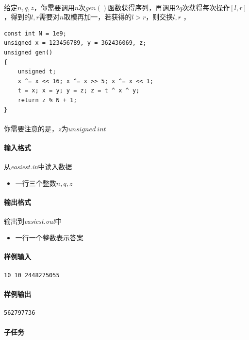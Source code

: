 \documentclass[UTF8]{ctexart}
\begin{document}
\paragraph{}给定$n,q,z$，你需要调用$n$次$gen()$函数获得序列，再调用$2q$次获得每次操作$[l,r]$，得到的$l,r$需要对$n$取模再加一，若获得的$l>r$，则交换$l,r$
\lstset{language=C++}，
\begin{lstlisting}
const int N = 1e9;
unsigned x = 123456789, y = 362436069, z;
unsigned gen()
{
	unsigned t;
	x ^= x << 16; x ^= x >> 5; x ^= x << 1;
	t = x; x = y; y = z; z = t ^ x ^ y;
	return z % N + 1;
}
\end{lstlisting}
\paragraph{}你需要注意的是，$z$为$unsigned\ int$
\paragraph{输入格式}
\paragraph{}从\emph{easiest.in}中读入数据
\begin{itemize}
\item 一行三个整数$n,q,z$
\end{itemize}
\paragraph{输出格式}
\paragraph{}输出到\emph{easiest.out}中
\begin{itemize}
	\item 一行一个整数表示答案
\end{itemize}
\paragraph{样例输入}
\begin{lstlisting}
10 10 2448275055
\end{lstlisting}
\paragraph{样例输出}
\begin{lstlisting}
562797736
\end{lstlisting}
\paragraph{子任务}
\end{document}
